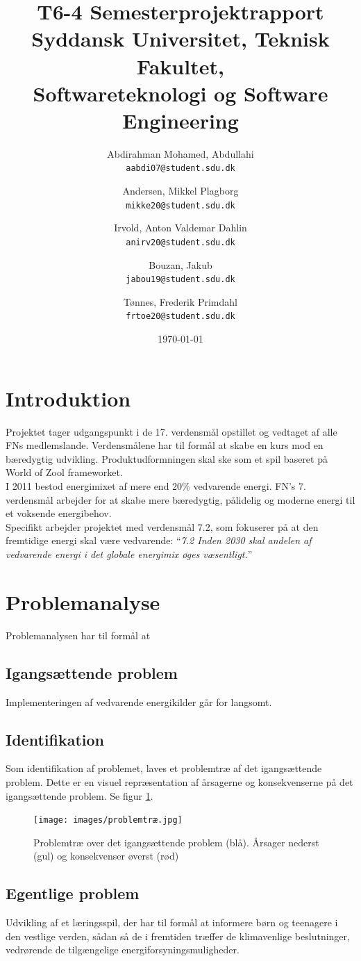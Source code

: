 \documentclass[a4paper,12pt]{report}
\title{T6-4 Semesterprojektrapport\\ \large Syddansk Universitet, Teknisk Fakultet,\\ Softwareteknologi og Software Engineering}
\author{
	Abdirahman Mohamed, Abdullahi\\
	\texttt{aabdi07@student.sdu.dk}
	\and
	Andersen, Mikkel Plagborg\\
	\texttt{mikke20@student.sdu.dk}
	\and
	Irvold, Anton Valdemar Dahlin\\
	\texttt{anirv20@student.sdu.dk}
	\and
	Bouzan, Jakub\\
	\texttt{jabou19@student.sdu.dk}
	\and
	Tønnes, Frederik Primdahl\\
	\texttt{frtoe20@student.sdu.dk}	 
}
\begin{document}
\date{\today}
\maketitle
\tableofcontents

\section{Introduktion}
Projektet tager udgangspunkt i de 17. verdensmål opstillet og vedtaget af alle FNs medlemslande. Verdensmålene har til formål at skabe en kurs mod en bæredygtig udvikling. Produktudformningen skal ske som et spil baseret på World of Zool frameworket.\\ 

I 2011 bestod energimixet af mere end 20\% vedvarende energi. FN’s 7. verdensmål arbejder for at skabe mere bæredygtig, pålidelig og moderne energi til et voksende energibehov.\\

Specifikt arbejder projektet med verdensmål 7.2, som fokuserer på at den fremtidige energi skal være vedvarende: “\textit{7.2 Inden 2030 skal andelen af vedvarende energi i det globale energimix øges væsentligt.}”\cite{verdensmaalene}

\section{Problemanalyse}
Problemanalysen har til formål at 
\subsection{Igangsættende problem}
Implementeringen af vedvarende energikilder går for langsomt.

\subsection{Identifikation}
Som identifikation af problemet, laves et problemtræ af det igangsættende problem. Dette er en visuel repræsentation af årsagerne og konsekvenserne på det igangsættende problem. Se figur \ref{fig:problemtræ}.

\begin{figure}[H]
	\texttt{[image: images/problemtræ.jpg]}
	\caption{Problemtræ over det igangsættende problem (blå). Årsager nederst (gul) og 		konsekvenser øverst (rød)}
	\label{fig:problemtræ}
\end{figure}

\subsection{Egentlige problem}
Udvikling af et læringsspil, der har til formål at informere børn og teenagere i den vestlige verden, sådan så de i fremtiden træffer de klimavenlige beslutninger, vedrørende de tilgængelige energiforsyningsmuligheder.
\end{document}
